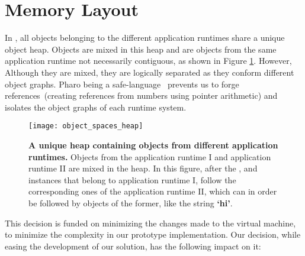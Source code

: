 
\section{Memory Layout} \label{sec:memory}

In \Vtt, all objects belonging to the different application runtimes share a unique object heap. Objects are mixed in this heap and are objects from the same application runtime not necessarily contiguous, as shown in Figure \ref{fig:heap}. However, Although they are mixed, they are logically separated as they conform different object graphs. Pharo being a safe-language~\cite{Hawb98a,Hawb02a} prevents us to forge references~(\ie creating references from numbers using pointer arithmetic) and isolates the object graphs of each runtime system.

\begin{figure}[ht]
\begin{center}
\texttt{[image: object\_spaces\_heap]}
\caption{\textbf{A unique heap containing objects from different application runtimes.} Objects from the application runtime I and application runtime II are mixed in the heap. In this figure, after the ,  and  instances that belong to application runtime I, follow the corresponding ones of the application runtime II, which can in order be followed by objects of the former, like the string \textbf{`hi'}. \label{fig:heap}}
\end{center}
\end{figure}

This decision is funded on minimizing the changes made to the virtual machine, to minimize the complexity in our prototype implementation. Our decision, while easing the development of our solution, has the following impact on it:

